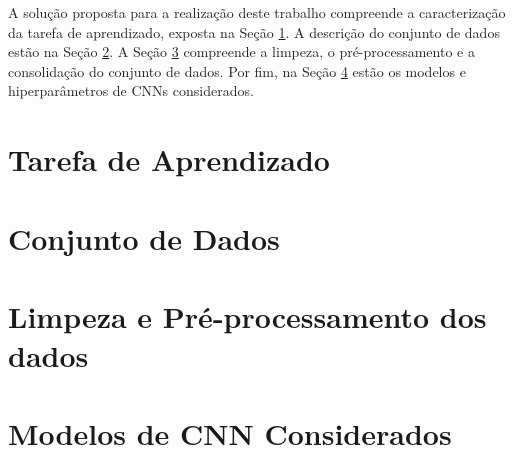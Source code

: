 A solução proposta para a realização deste trabalho compreende a caracterização da tarefa de aprendizado, exposta na Seção \ref{subsec:tarefa}. A descrição do conjunto de dados estão na Seção \ref{subsec:dataset}. A Seção \ref{subsec:limpeza} compreende a limpeza, o pré-processamento e a consolidação do conjunto de dados. Por fim, na Seção \ref{subsec:modelos} estão os modelos e hiperparâmetros de CNNs considerados.

\section{Tarefa de Aprendizado}\label{subsec:tarefa}


\section{Conjunto de Dados}\label{subsec:dataset}


\section{Limpeza e Pré-processamento dos dados}\label{subsec:limpeza}


\section{Modelos de CNN Considerados} \label{subsec:modelos}

